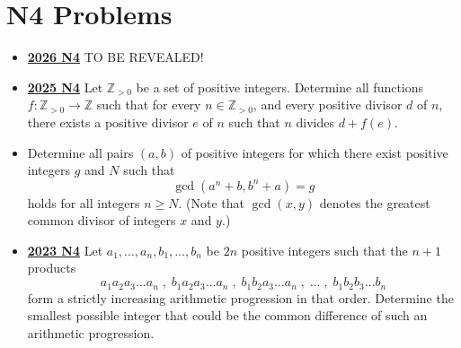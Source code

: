 \documentclass[11pt]{scrartcl}
\begin{document}
\section*{N4 Problems} \label{N4}
\begin{itemize}[leftmargin=*]


\item \href{https://www.imo-official.org/assets/documents/problems/2026/IMO2026SL.pdf}{\textbf{2026 N4}} TO BE REVEALED!


\item \href{https://artofproblemsolving.com/community/c6h3866861p38676953}{\textbf{2025 N4}} Let $\mathbb{Z}_{>0}$ be a set of positive integers. Determine all functions $f: \mathbb{Z}_{>0} \rightarrow \mathbb{Z}$ such that for every $n\in \mathbb{Z}_{>0}$, and every positive divisor $d$ of $n$, there exists a positive divisor $e$ of $n$ such that $n$ divides $d+f(e)$.

\item {} Determine all pairs $(a,b)$ of positive integers for which there exist positive integers $g$ and $N$ such that
$$\gcd (a^n+b,b^n+a)=g$$holds for all integers $n\geqslant  N.$ (Note that $\gcd(x, y)$ denotes the greatest common divisor of integers $x$ and $y.$)

\item \href{https://artofproblemsolving.com/community/c6h3359730p31218384}{\textbf{2023 N4}} Let $a_1, \dots, a_n, b_1, \dots, b_n$ be $2n$ positive integers such that the $n+1$ products
\[a_1 a_2 a_3 \dots a_n \; , \; b_1 a_2 a_3 \dots a_n \; , \; b_1 b_2 a_3 \dots a_n \; , \; \dots \; , \; b_1 b_2 b_3 \dots b_n\]form a strictly increasing arithmetic progression in that order. Determine the smallest possible integer that could be the common difference of such an arithmetic progression.	


\end{itemize}
\end{document}
